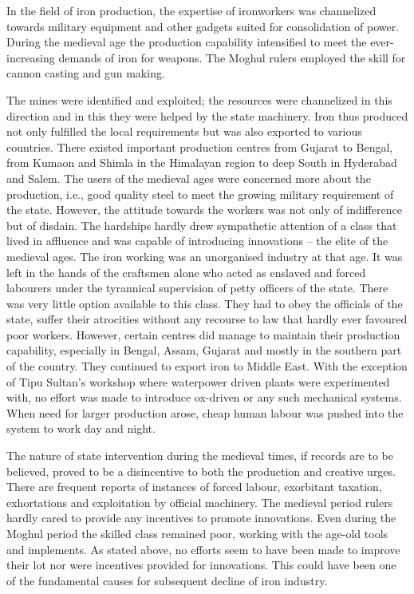 In the field of iron production, the expertise of ironworkers was channelized towards military equipment and other gadgets suited for consolidation of power. During the medieval age the production capability intensified to meet the ever-increasing demands of iron for weapons. The Moghul rulers employed the skill for cannon casting and gun making.

The mines were identified and exploited; the resources were channelized in this direction and in this they were helped by the state machinery. Iron thus produced not only fulfilled the local requirements but was also exported to various countries. There existed important production centres from Gujarat to Bengal, from Kumaon and Shimla in the Himalayan region to deep South in Hyderabad and Salem. The users of the medieval ages were concerned more about the production, i.e., good quality steel to meet the growing military requirement of the state. However, the attitude towards the workers was not only of indifference but of disdain. The hardships hardly drew sympathetic attention of a class that lived in affluence and was capable of introducing innovations – the elite of the medieval ages. The iron working was an unorganised industry at that age. It was left in the hands of the craftsmen alone who acted as enslaved and forced labourers under the tyrannical supervision of petty officers of the state. There was very little option available to this class. They had to obey the officials of the state, suffer their atrocities without any recourse to law that hardly ever favoured poor workers. However, certain centres did manage to maintain their production capability, especially in Bengal, Assam, Gujarat and mostly in the southern part of the country. They continued to export iron to Middle East. With the exception of Tipu Sultan's workshop where waterpower driven plants were experimented with, no effort was made to introduce ox-driven or any such mechanical systems. When need for larger production arose, cheap human labour was pushed into the system to work day and night. 

The nature of state intervention during the medieval times, if records are to be believed, proved to be a disincentive to both the production and creative urges. There are frequent reports of instances of forced labour, exorbitant taxation, exhortations and exploitation by official machinery. The medieval period rulers hardly cared to provide any incentives to promote innovations. Even during the Moghul period the skilled class remained poor, working with the age-old tools and implements. As stated above, no efforts seem to have been made to improve their lot nor were incentives provided for innovations. This could have been one of the fundamental causes for subsequent decline of iron industry.

